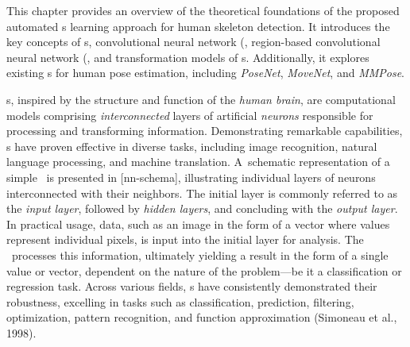 This chapter provides an overview of the theoretical foundations of the proposed automated \NN\-s learning approach for human skeleton detection. It introduces the key concepts of \NN\-s, convolutional neural network  (\CNN\), region-based convolutional neural network  (\RCNN\), and transformation models of \NN\-s. Additionally, it explores existing \NN\-s for human pose estimation, including {\em PoseNet}, {\em MoveNet}, and {\em MMPose}.

\NN\-s, inspired by the structure and function of the {\em human brain}, are computational models comprising {\em interconnected} layers of artificial {\em neurons} responsible for processing and transforming information. Demonstrating remarkable capabilities, \NN\-s have proven effective in diverse tasks, including image recognition, natural language processing, and machine translation. A~schematic representation of a simple \NN\ is presented in [nn-schema], illustrating individual layers of neurons interconnected with their neighbors. The initial layer is commonly referred to as the {\em input layer}, followed by {\em hidden layers}, and concluding with the {\em output layer}. In practical usage, data, such as an image in the form of a vector where values represent individual pixels, is input into the initial layer for analysis. The \NN\ processes this information, ultimately yielding a result in the form of a single value or vector, dependent on the nature of the problem—be it a classification or regression task. Across various fields, \NN\-s have consistently demonstrated their robustness, excelling in tasks such as classification, prediction, filtering, optimization, pattern recognition, and function approximation (\scc Simoneau et al., 1998).


